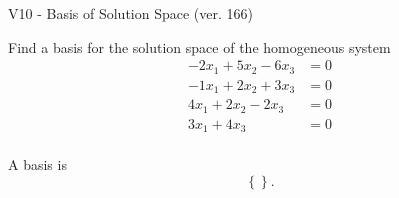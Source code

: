 \begin{exercise}
  \begin{exerciseTitle}V10 - Basis of Solution Space (ver. 166)\end{exerciseTitle}
  \begin{exerciseStatement}
    Find a basis for the solution space of the homogeneous system 
\begin{align*}
 -2 x_ 1 + 5 x_ 2 -6 x_ 3 &= 0  \\ 
  -1 x_ 1 + 2 x_ 2 + 3 x_ 3 &= 0  \\ 
  4 x_ 1 + 2 x_ 2 -2 x_ 3 &= 0  \\ 
  3 x_ 1 + 4 x_ 3 &= 0  \\ 
 \end{align*}


 
  \end{exerciseStatement}

  \begin{exerciseAnswer}
   A basis is   
\[\left\{\right\}.\]

  


  \end{exerciseAnswer}
\end{exercise}
